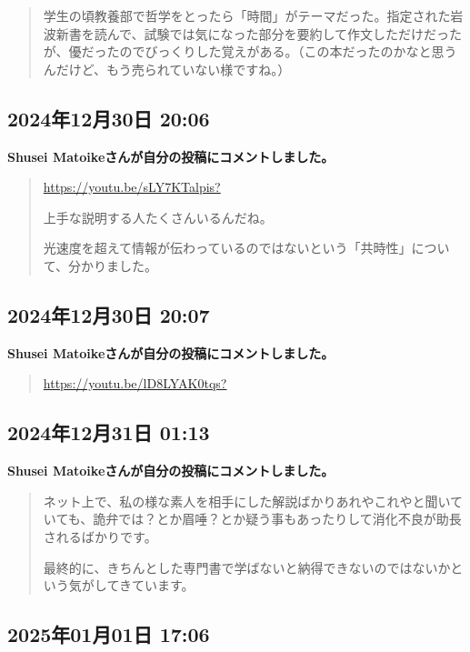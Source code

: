 \begin{quote}
学生の頃教養部で哲学をとったら「時間」がテーマだった。指定された岩波新書を読んで、試験では気になった部分を要約して作文しただけだったが、優だったのでびっくりした覚えがある。（この本だったのかなと思うんだけど、もう売られていない様ですね。）
\end{quote}

\subsection*{2024年12月30日 20:06}

\textbf{Shusei Matoikeさんが自分の投稿にコメントしました。}

\begin{quote}
\url{https://youtu.be/sLY7KTalpis?}

上手な説明する人たくさんいるんだね。

光速度を超えて情報が伝わっているのではないという「共時性」について、分かりました。
\end{quote}

\subsection*{2024年12月30日 20:07}

\textbf{Shusei Matoikeさんが自分の投稿にコメントしました。}

\begin{quote}
\url{https://youtu.be/lD8LYAK0tqs?}
\end{quote}

\subsection*{2024年12月31日 01:13}

\textbf{Shusei Matoikeさんが自分の投稿にコメントしました。}

\begin{quote}
ネット上で、私の様な素人を相手にした解説ばかりあれやこれやと聞いていても、詭弁では？とか眉唾？とか疑う事もあったりして消化不良が助長されるばかりです。

最終的に、きちんとした専門書で学ばないと納得できないのではないかという気がしてきています。
\end{quote}

\subsection*{2025年01月01日 17:06}

